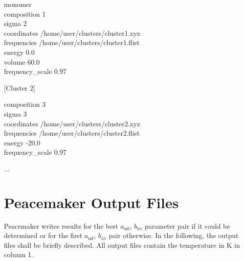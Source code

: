 \documentclass{scrartcl}
\newcommand{\amf}{a_\mathrm{mf}}
\newcommand{\bxv}{b_\mathrm{xv}}
\begin{document}
\clearpage
\begin{addmargin}[1cm]{0cm}
    \ttfamily
    [Cluster 1]
    \begin{addmargin}[1cm]{0cm}
        monomer \\
        composition 1 \\
        sigma 2 \\
        coordinates /home/user/clusters/cluster1.xyz \\
        frequencies /home/user/clusters/cluster1.flist \\
        energy 0.0 \\
        volume 60.0 \\
        frequency\_scale 0.97
    \end{addmargin}
    [Cluster 2]
    \begin{addmargin}[1cm]{0cm}
        composition 3 \\
        sigma 3 \\
        coordinates /home/user/clusters/cluster2.xyz \\
        frequencies /home/user/clusters/cluster2.flist \\
        energy -20.0 \\
        frequency\_scale 0.97
    \end{addmargin}
    ...
\end{addmargin}



\section{Peacemaker Output Files}

Peacemaker writes results for the best $\amf$, $\bxv$ parameter pair if it could be determined or for the first $\amf$, $\bxv$ pair otherwise.
In the following, the output files shall be briefly described.
All output files contain the temperature in \si{K} in column 1.
\end{document}
